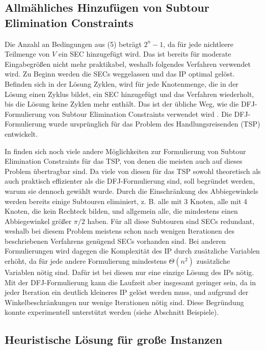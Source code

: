 \documentclass[a4paper, 10pt, ngerman]{article}
\begin{document}
\subsection{Allmähliches Hinzufügen von Subtour Elimination Constraints}

Die Anzahl an Bedingungen aus (5) beträgt $2^n - 1$, da für jede nichtleere Teilmenge von $V$ ein SEC hinzugefügt wird. Das ist bereits für moderate Eingabegrößen nicht mehr praktikabel, weshalb folgendes Verfahren verwendet wird. Zu Beginn werden die SECs weggelassen und das IP optimal gelöst. Befinden sich in der Lösung Zyklen, wird für jede Knotenmenge, die in der Lösung einen Zyklus bildet, ein SEC hinzugefügt und das Verfahren wiederholt, bis die Lösung keine Zyklen mehr enthält. Das ist der übliche Weg, wie die DFJ-Formulierung von Subtour Elimination Constraints verwendet wird \cite{tsp-formulations}. Die DFJ-Formulierung wurde ursprünglich für das Problem des Handlungsreisenden (TSP) entwickelt.

In \cite{tsp-formulations} finden sich noch viele andere Möglichkeiten zur Formulierung von Subtour Elimination Constraints für das TSP, von denen die meisten auch auf dieses Problem übertragbar sind. Da viele von diesen für das TSP sowohl theoretisch als auch praktisch effizienter als die DFJ-Formulierung sind, soll begründet werden, warum sie dennoch gewählt wurde. Durch die Einschränkung des Abbiegewinkels werden bereits einige Subtouren eliminiert, z. B. alle mit 3 Knoten, alle mit 4 Knoten, die kein Rechteck bilden, und allgemein alle, die mindestens einen Abbiegewinkel größer $\pi / 2$ haben. Für all diese Subtouren sind SECs redundant, weshalb bei diesem Problem meistens schon nach wenigen Iterationen des beschriebenen Verfahrens genügend SECs vorhanden sind. Bei anderen Formulierungen wird dagegen die Komplexität des IP durch zusätzliche Variablen erhöht, da für jede andere Formulierung mindestens $\Theta(n^2)$ zusätzliche Variablen nötig sind. Dafür ist bei diesen nur eine einzige Lösung des IPs nötig. Mit der DFJ-Formulierung kann die Laufzeit aber insgesamt geringer sein, da in jeder Iteration ein deutlich kleineres IP gelöst werden muss, und aufgrund der Winkelbeschränkungen nur wenige Iterationen nötig sind. Diese Begründung konnte experimentell unterstützt werden (siehe Abschnitt Beispiele).

\subsection{Heuristische Lösung für große Instanzen}
\end{document}
